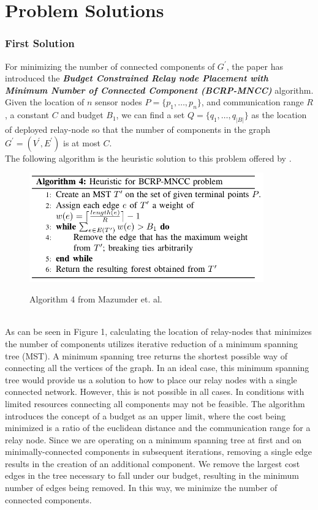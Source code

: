 \documentclass{article}
\begin{document}
\section{Problem Solutions}
\subsubsection*{First Solution}For minimizing the number of connected components of $G^\prime$, the paper \cite{relay-node} has introduced the \textbf{\textit{Budget Constrained Relay node Placement with Minimum Number of Connected Component (BCRP-MNCC)}} algorithm. Given the location of $n$ sensor nodes $P=\{p_1, \hdots, p_n\}$, and communication range $R$, a constant $C$ and budget $B_1$, we can find a set $Q=\{q_1, \hdots, q_{|B|}\}$ as the location of deployed relay-node so that the number of components in the graph $G^\prime=(V^\prime, E^\prime)$ is at most $C$. \\
The following algorithm is the heuristic solution to this problem offered by \cite{relay-node}.
\begin{figure}[h]
\centering
\includegraphics[width=0.9\textwidth]{Alg4.png}
\label{alg4}
\caption{Algorithm 4 from Mazumder et. al.}
\end{figure}\\

As can be seen in Figure 1, calculating the location of relay-nodes that minimizes the number of components utilizes iterative reduction of a minimum spanning tree (MST). A minimum spanning tree returns the shortest possible way of connecting all the vertices of the graph. In an ideal case, this minimum spanning tree would provide us a solution to how to place our relay nodes with a single connected network. However, this is not possible in all cases. In conditions with limited resources connecting all components may not be feasible. The algorithm introduces the concept of a budget as an upper limit, where the cost being minimized is a ratio of the euclidean distance and the communication range for a relay node. Since we are operating on a minimum spanning tree at first and on minimally-connected components in subsequent iterations, removing a single edge results in the creation of an additional component. We remove the largest cost edges in the tree necessary to fall under our budget, resulting in the minimum number of edges being removed. In this way, we minimize the number of connected components.\\
\end{document}
